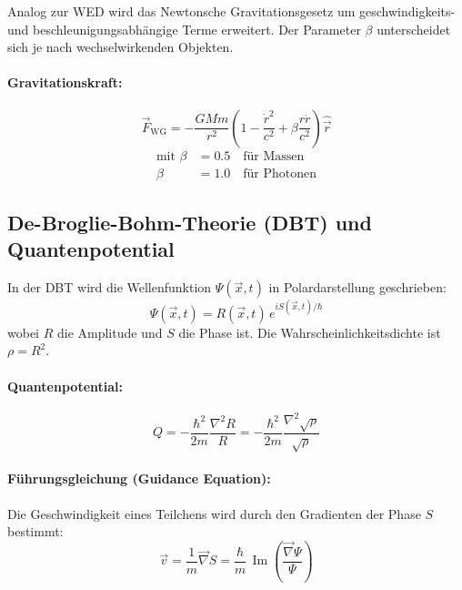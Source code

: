 \documentclass[11pt, a4paper]{article}
\begin{document}
Analog zur WED wird das Newtonsche Gravitationsgesetz um geschwindigkeits- und beschleunigungsabhängige Terme erweitert. Der Parameter $\beta$ unterscheidet sich je nach wechselwirkenden Objekten.

\paragraph{Gravitationskraft:}
\begin{equation}
\label{eq:weber_grav}
\vec{F}_{\text{WG}} = -\frac{G M m}{r^2} \left( 1 - \frac{\dot{r}^2}{c^2} + \beta \frac{r \ddot{r}}{c^2} \right) \hat{\vec{r}}
\end{equation}
\begin{align*}
\text{mit } \beta &= 0.5 \quad \text{für Massen} \\
\beta &= 1.0 \quad \text{für Photonen}
\end{align*}

\subsection{De-Broglie-Bohm-Theorie (DBT) und Quantenpotential}
\label{subsec:dbt}

In der DBT wird die Wellenfunktion $\Psi(\vec{x}, t)$ in Polardarstellung geschrieben:
\[
\Psi(\vec{x}, t) = R(\vec{x}, t) \, e^{i S(\vec{x}, t) / \hbar}
\]
wobei $R$ die Amplitude und $S$ die Phase ist. Die Wahrscheinlichkeitsdichte ist $\rho = R^2$.

\paragraph{Quantenpotential:}
\begin{equation}
\label{eq:quantenpotential}
Q = -\frac{\hbar^2}{2m} \frac{\nabla^2 R}{R} = -\frac{\hbar^2}{2m} \frac{\nabla^2 \sqrt{\rho}}{\sqrt{\rho}}
\end{equation}

\paragraph{Führungsgleichung (Guidance Equation):}
Die Geschwindigkeit eines Teilchens wird durch den Gradienten der Phase $S$ bestimmt:
\begin{equation}
\label{eq:fuehrungsgleichung}
\vec{v} = \frac{1}{m} \vec{\nabla} S = \frac{\hbar}{m} \, \operatorname{Im} \left( \frac{\vec{\nabla} \Psi}{\Psi} \right)
\end{equation}
\end{document}
